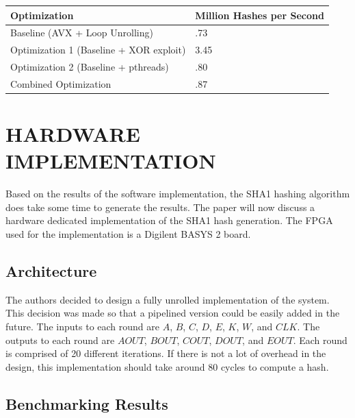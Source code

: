 \documentclass[letterpaper, 10 pt, conference]{ieeeconf}  %
\begin{document}


\begin{center}
    \begin{tabular}{| l | l |}
        \hline
        Optimization & Million Hashes per Second \\ \hline
        Baseline (AVX + Loop Unrolling) & .73 \\ \hline
        Optimization 1 (Baseline + XOR exploit) & 3.45 \\ \hline
        Optimization 2 (Baseline + pthreads) & .80 \\ \hline
        Combined Optimization & .87 \\
        \hline
    \end{tabular}
\end{center}

\section{HARDWARE IMPLEMENTATION}

Based on the results of the software implementation, the SHA1 hashing algorithm does take some time to generate the results.  The paper will now discuss a hardware dedicated implementation of the SHA1 hash generation.  The FPGA used for the implementation is a Digilent BASYS 2 board.
\subsection{Architecture}

The authors decided to design a fully unrolled implementation of the system.  This decision was made so that a pipelined version could be easily added in the future.  The inputs to each round are $A$, $B$, $C$, $D$, $E$, $K$, $W$, and $CLK$.  The outputs to each round are $AOUT$, $BOUT$, $COUT$, $DOUT$, and $EOUT$.  Each round is comprised of 20 different iterations.  If there is not a lot of overhead in the design, this implementation should take around 80 cycles to compute a hash.

\subsection{Benchmarking Results}
\end{document}
